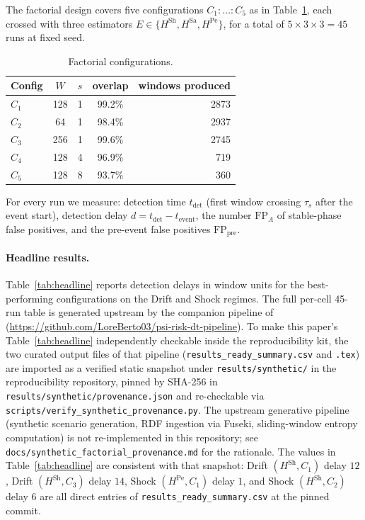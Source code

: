 \documentclass[futureinternet,article,submit,pdftex,moreauthors]{Definitions/mdpi}
\newcommand{\Hsh}{\ensuremath{H^{\mathrm{Sh}}}}
\newcommand{\Hsa}{\ensuremath{H^{\mathrm{Sa}}}}
\newcommand{\Hpe}{\ensuremath{H^{\mathrm{Pe}}}}
\newcommand{\taus}{\ensuremath{\tau_{s}}}
\begin{document}
The factorial design covers five configurations $C_1{:}\ldots{:}C_5$ as
in Table~\ref{tab:configs}, each crossed with three estimators
$E \in \{\Hsh, \Hsa, \Hpe\}$, for a total of $5 \times 3 \times 3 = 45$
runs at fixed seed.

\begin{table}[t]
\centering
\caption{Factorial configurations.}
\label{tab:configs}
\small
\begin{tabular}{@{}lcccr@{}}
\toprule
Config & $W$ & $s$ & overlap & windows produced \\
\midrule
$C_1$ & 128 & 1 & 99.2\% & 2873 \\
$C_2$ &  64 & 1 & 98.4\% & 2937 \\
$C_3$ & 256 & 1 & 99.6\% & 2745 \\
$C_4$ & 128 & 4 & 96.9\% & 719 \\
$C_5$ & 128 & 8 & 93.7\% & 360 \\
\bottomrule
\end{tabular}
\end{table}

For every run we measure: detection time $t_{\mathrm{det}}$ (first
window crossing $\taus$ after the event start), detection delay
$d = t_{\mathrm{det}} - t_{\mathrm{event}}$, the number $\mathrm{FP}_A$
of stable-phase false positives, and the pre-event false positives
$\mathrm{FP}_{\mathrm{pre}}$.

\paragraph{Headline results.} Table~\ref{tab:headline} reports detection
delays in window units for the best-performing configurations on the
Drift and Shock regimes. The full per-cell 45-run table is generated
upstream by the companion pipeline of~\cite{berto2026}
(\url{https://github.com/LoreBerto03/psi-risk-dt-pipeline}). To make
this paper's Table~\ref{tab:headline} independently checkable inside
the reproducibility kit, the two curated output files of that pipeline
(\texttt{results\_ready\_summary.csv} and \texttt{.tex}) are imported
as a verified static snapshot under
\texttt{results/synthetic/} in the reproducibility repository, pinned
by SHA-256 in \texttt{results/synthetic/provenance.json} and
re-checkable via \texttt{scripts/verify\_synthetic\_provenance.py}.
The upstream generative pipeline (synthetic scenario generation, RDF
ingestion via Fuseki, sliding-window entropy computation) is not
re-implemented in this repository; see
\texttt{docs/synthetic\_factorial\_provenance.md} for the rationale.
The values in Table~\ref{tab:headline} are consistent with that
snapshot: Drift $(\Hsh, C_1)$ delay $12$, Drift $(\Hsh, C_3)$ delay $14$,
Shock $(\Hpe, C_1)$ delay $1$, and Shock $(\Hsh, C_2)$ delay $6$ are all
direct entries of \texttt{results\_ready\_summary.csv} at the pinned
commit.
\end{document}
